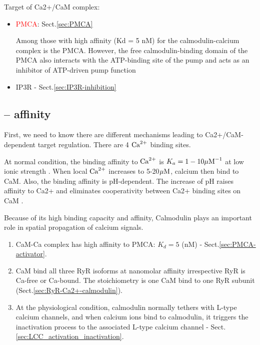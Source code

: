 Target of Ca2+/CaM complex:
\begin{itemize}
  \item  \textcolor{red}{PMCA}: Sect.\ref{sec:PMCA}

Among those with high affinity (Kd = 5 nM) for the calmodulin-calcium complex
is the PMCA.
However, the free calmodulin-binding domain of the PMCA also interacts
with the ATP-binding site of the pump and acts as an inhibitor of ATP-driven pump
function

  \item IP3R - Sect.\ref{sec:IP3R-inhibition}
  
\end{itemize}
  

\subsection{-- affinity}

First, we need to know there are different mechanisms leading to
Ca2+/CaM-dependent target regulation. There are 4 ${\text{Ca}^{2+}}$ binding sites.

At normal condition, the binding affinity to ${\text{Ca}^{2+}}$ is $K_a = 1-10 {\mu\text{M}}^{-1}$ at
low ionic strength \citep{linse1991}.
When local ${\text{Ca}^{2+}}$ increases to 5-20${\mu\text{M}}$, calcium then bind to CaM. Also, the
binding affinity is pH-dependent. The increase of pH raises affinity to Ca2+ and
eliminates cooperativity between Ca2+ binding sites on CaM \citep{valeyev2008}.

Because of its high binding capacity and affinity, Calmodulin plays an important
role in spatial propagation of calcium signals. 

\begin{enumerate}
  
  \item CaM-Ca complex has high affinity to PMCA: $K_d = 5$ (nM) -
  Sect.\ref{sec:PMCA-activator}.
  
  \item CaM bind all three RyR isoforms at nanomolar affinity irrespective RyR
  is Ca-free or Ca-bound. The stoichiometry is one CaM bind to one RyR subunit
  (Sect.\ref{sec:RyR-Ca2+-calmodulin}).
  
  \item At the physiological condition, calmodulin normally tethers with L-type calcium
channels, and when calcium ions bind to calmodulin, it triggers the inactivation
process to the associated L-type calcium channel -
Sect.\ref{sec:LCC_activation_inactivation}.
\end{enumerate}


